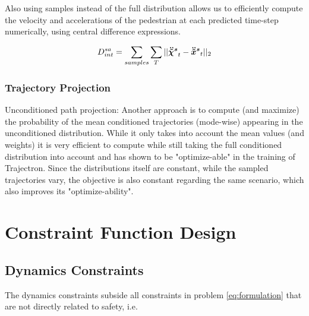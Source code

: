 Also using samples instead of the full distribution allows us to efficiently compute the velocity and accelerations of the pedestrian at each predicted time-step numerically, using central difference expressions. 

\begin{equation}
D_{int}^{sa} = \sum_{samples} \sum_T ||\ddxpedwo[s]_t - \ddxped[s]_t||_2
\end{equation}


\subsubsection{Trajectory Projection}
Unconditioned path projection: Another approach is to compute (and maximize) the probability of the mean conditioned trajectories (mode-wise) appearing in the unconditioned distribution. While it only takes into account the mean values (and weights) it is very efficient to compute while still taking the full conditioned distribution into account and has shown to be "optimize-able" in the training of Trajectron. Since the distributions itself are constant, while the sampled trajectories vary, the objective is also constant regarding the same scenario, which also improves its "optimize-ability".

 



\section{Constraint Function Design}
\label{text:approach/constraint}

\subsection{Dynamics Constraints}
\label{text:approach/constraint/dynamics}
The dynamics constraints subside all constraints in problem \ref{eq:formulation} that are not directly related to safety, i.e. 

